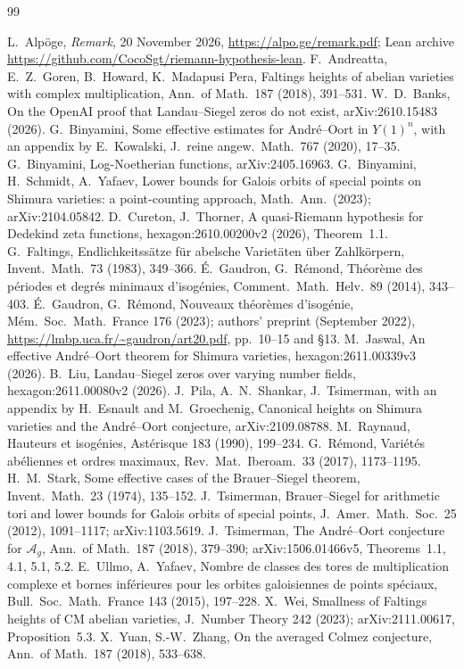 \documentclass[11pt,a4paper]{article}
\theoremstyle{plain}
\theoremstyle{remark}
\begin{document}
\begin{thebibliography}{99}
\small\raggedright
{} L.~Alp\"oge, \emph{Remark}, 20 November 2026, \url{https://alpo.ge/remark.pdf}; Lean archive
\url{https://github.com/CocoSgt/riemann-hypothesis-lean}.
 F.~Andreatta, E.~Z.~Goren, B.~Howard, K.~Madapusi Pera, Faltings heights of abelian varieties with
complex multiplication, Ann.\ of Math.\ 187 (2018), 391--531.
 W.~D.~Banks, On the OpenAI proof that Landau--Siegel zeros do not exist, arXiv:2610.15483 (2026).
 G.~Binyamini, Some effective estimates for Andr\'e--Oort in $Y(1)^n$, with an appendix by
E.~Kowalski, J.\ reine angew.\ Math.\ 767 (2020), 17--35.
 G.~Binyamini, Log-Noetherian functions, arXiv:2405.16963.
 G.~Binyamini, H.~Schmidt, A.~Yafaev, Lower bounds for Galois orbits of special points on Shimura
varieties: a point-counting approach, Math.\ Ann.\ (2023); arXiv:2104.05842.
 D.~Cureton, J.~Thorner, A quasi-Riemann hypothesis for Dedekind zeta functions, hexagon:2610.00200v2
(2026), Theorem~1.1.
 G.~Faltings, Endlichkeitss\"atze f\"ur abelsche Variet\"aten \"uber Zahlk\"orpern, Invent.\ Math.\
73 (1983), 349--366.
 \'E.~Gaudron, G.~R\'emond, Th\'eor\`eme des p\'eriodes et degr\'es minimaux d'isog\'enies, Comment.\
Math.\ Helv.\ 89 (2014), 343--403.
\bibitem{GR23} \'E.~Gaudron, G.~R\'emond, Nouveaux th\'eor\`emes d'isog\'enie, M\'em.\ Soc.\ Math.\ France 176 (2023);
authors' preprint (September 2022), \url{https://lmbp.uca.fr/~gaudron/art20.pdf}, pp.~10--15 and \S13.
\bibitem{Jaswal} M.~Jaswal, An effective Andr\'e--Oort theorem for Shimura varieties, hexagon:2611.00339v3 (2026).
\bibitem{Liu} B.~Liu, Landau--Siegel zeros over varying number fields, hexagon:2611.00080v2 (2026).
\bibitem{PST} J.~Pila, A.~N.~Shankar, J.~Tsimerman, with an appendix by H.~Esnault and M.~Groechenig, Canonical
heights on Shimura varieties and the Andr\'e--Oort conjecture, arXiv:2109.08788.
\bibitem{Raynaud} M.~Raynaud, Hauteurs et isog\'enies, Ast\'erisque 183 (1990), 199--234.
\bibitem{Remond} G.~R\'emond, Vari\'et\'es ab\'eliennes et ordres maximaux, Rev.\ Mat.\ Iberoam.\ 33 (2017),
1173--1195.
\bibitem{Stark} H.~M.~Stark, Some effective cases of the Brauer--Siegel theorem, Invent.\ Math.\ 23 (1974), 135--152.
 J.~Tsimerman, Brauer--Siegel for arithmetic tori and lower bounds for Galois orbits of special points,
J.\ Amer.\ Math.\ Soc.\ 25 (2012), 1091--1117; arXiv:1103.5619.
\bibitem{Ts18} J.~Tsimerman, The Andr\'e--Oort conjecture for $\mathcal A_g$, Ann.\ of Math.\ 187 (2018), 379--390;
arXiv:1506.01466v5, Theorems~1.1, 4.1, 5.1, 5.2.
\bibitem{UY} E.~Ullmo, A.~Yafaev, Nombre de classes des tores de multiplication complexe et bornes inf\'erieures pour
les orbites galoisiennes de points sp\'eciaux, Bull.\ Soc.\ Math.\ France 143 (2015), 197--228.
\bibitem{Wei} X.~Wei, Smallness of Faltings heights of CM abelian varieties, J.\ Number Theory 242 (2023); arXiv:2111.00617,
Proposition~5.3.
\bibitem{YZ} X.~Yuan, S.-W.~Zhang, On the averaged Colmez conjecture, Ann.\ of Math.\ 187 (2018), 533--638.
\end{thebibliography}
\end{document}
